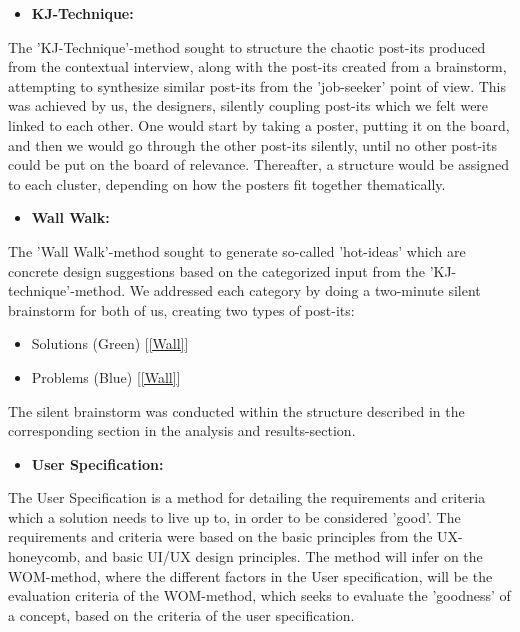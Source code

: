 \begin{itemize}
    \item \bf{KJ-Technique:}
\end{itemize}

The 'KJ-Technique'-method sought to structure the chaotic post-its produced from the contextual interview, along with the post-its created from a brainstorm, attempting to synthesize similar post-its from the 'job-seeker' point of view. This was achieved by us, the designers, silently coupling post-its which we felt were linked to each other. One would start by taking a poster, putting it on the board, and then we would go through the other post-its silently, until no other post-its could be put on the board of relevance. Thereafter, a structure would be assigned to each cluster, depending on how the posters fit together thematically.

\begin{itemize}
    \item \bf{Wall Walk:}
\end{itemize}

The 'Wall Walk'-method sought to generate so-called 'hot-ideas' which are concrete design suggestions based on the categorized input from the 'KJ-technique'-method. We addressed each category by doing a two-minute silent brainstorm for both of us, creating two types of post-its:
\begin{itemize}
    \item Solutions (Green) [\ref{Wall}]
    \item Problems (Blue) [\ref{Wall}]
\end{itemize}
The silent brainstorm was conducted within the structure described in the corresponding section in the analysis and results-section.

\begin{itemize}
    \item \bf{User Specification:}
\end{itemize}

The User Specification is a method for detailing the requirements and criteria which a solution needs to live up to, in order to be considered 'good'. The requirements and criteria were based on the basic principles from the UX-honeycomb\cite{UXHoneycomb}, and basic UI/UX design principles. The method will infer on the WOM-method, where the different factors in the User specification, will be the evaluation criteria of the WOM-method, which seeks to evaluate the 'goodness' of a concept, based on the criteria of the user specification.


